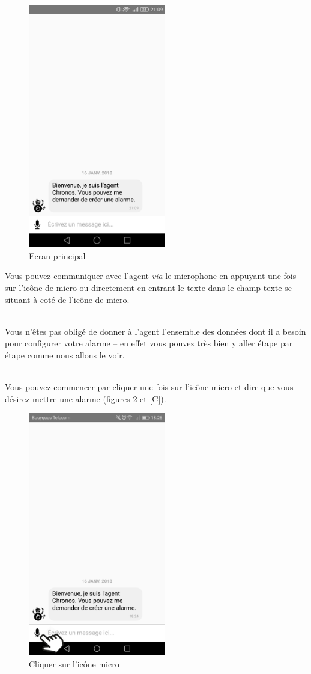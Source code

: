 \begin{figure}[H]
  \centering
  \includegraphics[width=6cm]{images/B1.png}
  \caption{Ecran principal}
  \label{B1}
\end{figure}

Vous pouvez communiquer avec l'agent \emph{via} le microphone en appuyant une fois sur l'icône de micro
ou directement en entrant le texte dans le champ texte se situant à coté de l'icône de micro. 

~\\\indent Vous n'êtes pas obligé de donner à l'agent l'ensemble des données
dont il a besoin pour configurer votre alarme \--- en effet vous pouvez très bien y aller étape par étape comme nous allons le voir. 

~\\\indent Vous pouvez commencer par cliquer
une fois sur l'icône micro et dire que vous désirez mettre une alarme (figures \ref{B} et \ref{C}).

\begin{figure}[H]
  \centering
  \includegraphics[width=6cm]{images/B.png}
  \caption{Cliquer sur l'icône micro}
  \label{B}
\end{figure}

